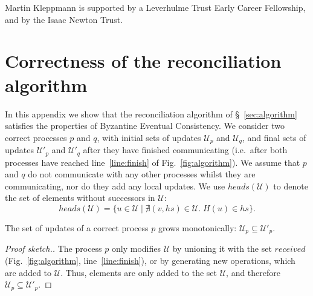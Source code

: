 \documentclass[manuscript,anonymous]{acmart}
\begin{document}
\begin{acks}
Martin Kleppmann is supported by a Leverhulme Trust Early Career Fellowship, and by the Isaac Newton Trust.
\end{acks}




\appendix
\section{Correctness of the reconciliation algorithm}

In this appendix we show that the reconciliation algorithm of \S~\ref{sec:algorithm} satisfies the properties of Byzantine Eventual Consistency.
We consider two correct processes $p$ and $q$, with initial sets of updates $\mathcal{U}_p$ and $\mathcal{U}_q$, and final sets of updates $\mathcal{U}'_p$ and $\mathcal{U}'_q$ after they have finished communicating (i.e.\ after both processes have reached line~\ref{line:finish} of Fig.~\ref{fig:algorithm}).
We assume that $p$ and $q$ do not communicate with any other processes whilst they are communicating, nor do they add any local updates.
We use $\mathit{heads}(\mathcal{U})$ to denote the set of elements without successors in $\mathcal{U}$:
\[ \mathit{heads}(\mathcal{U}) = \{u \in \mathcal{U} \mid \nexists (v, \mathit{hs}) \in \mathcal{U}.\; H(u) \in \mathit{hs}\}. \]

\begin{lemma}\label{lemma:no-p-missing}
The set of updates of a correct process $p$ grows monotonically: $\mathcal{U}_p \subseteq \mathcal{U}'_p$.
\end{lemma}
\begin{proof}[Proof sketch.]
The process $p$ only modifies $\mathcal{U}$ by unioning it with the set $\mathit{received}$ (Fig.~\ref{fig:algorithm}, line~\ref{line:finish}), or by generating new operations, which are added to $\mathcal{U}$.
Thus, elements are only added to the set $\mathcal{U}$, and therefore $\mathcal{U}_p \subseteq \mathcal{U}'_p$.
\end{proof}
\end{document}

